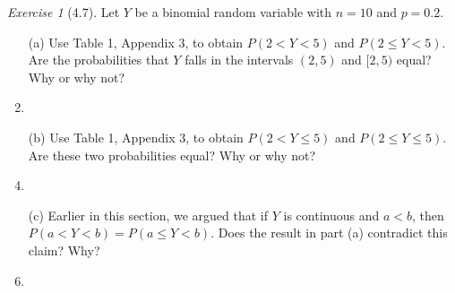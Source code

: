 \documentclass[12pt]{amsart}
\makeatletter
\theoremstyle{remark}
\newtheorem*{exercise}{Exercise}%
\renewenvironment{proof}[1][\proofname]{\par\doublespacing
  \pushQED{\qed}%
  \normalfont \topsep6\p@\@plus6\p@\relax
  \list{}{%
    \settowidth{\leftmargin}{\itshape\proofname:\hskip\labelsep}%
    \setlength{\labelwidth}{0pt}%
    \setlength{\itemindent}{-\leftmargin}%
  }%
  \item[\hskip\labelsep\itshape#1\@addpunct{:}]\ignorespaces
}{%
  \popQED\endlist\@endpefalse
  \singlespacing
}
\theoremstyle{mycomment}
\makeatother
\begin{document}
\begin{exercise}[4.7]
Let $Y$ be a binomial random variable with $n = 10$ and $p = 0.2$.

\begin{enumerate}
    \item[(a)] Use Table 1, Appendix 3, to obtain $P(2 < Y < 5)$ and $P(2 \leq Y < 5)$. Are the probabilities that $Y$ falls in the intervals $(2, 5)$ and $[2, 5)$ equal? Why or why not?
\begin{proof}[Solution]
 
\end{proof}
    \item[(b)] Use Table 1, Appendix 3, to obtain $P(2 < Y \leq 5)$ and $P(2 \leq Y \leq 5)$. Are these two probabilities equal? Why or why not?
\begin{proof}[Solution]
 
\end{proof}
    \item[(c)] Earlier in this section, we argued that if $Y$ is continuous and $a < b$, then $P(a < Y < b) = P(a \leq Y < b)$. Does the result in part (a) contradict this claim? Why?
\begin{proof}[Solution]
 
\end{proof}
\end{enumerate} 
\end{exercise}
\end{document}
